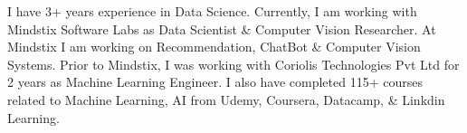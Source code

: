 
\begin{cvparagraph}
I have 3+ years experience in Data Science. Currently, I am working with Mindstix Software Labs as Data Scientist \& Computer Vision Researcher. 
At Mindstix I am working on Recommendation, ChatBot \& Computer Vision Systems.
\newline Prior to Mindstix, I was working with Coriolis Technologies Pvt Ltd for 2 years as Machine Learning Engineer.
\newline I also have completed 115+ courses related to Machine Learning, AI from Udemy, Coursera, Datacamp, \& Linkdin Learning.

\end{cvparagraph}
